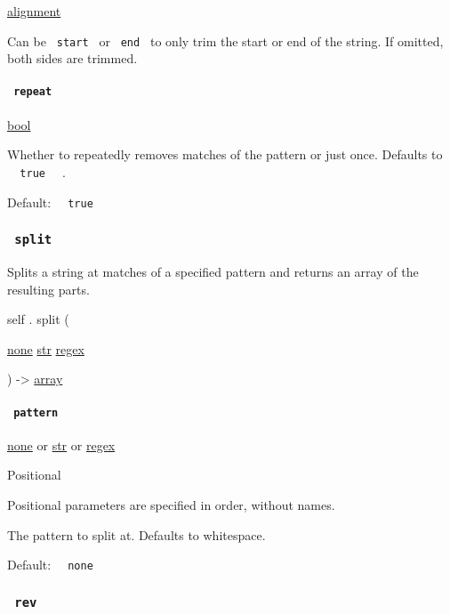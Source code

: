 \href{/docs/reference/layout/alignment/}{alignment}

Can be \texttt{\ start\ } or \texttt{\ end\ } to only trim the start or
end of the string. If omitted, both sides are trimmed.

\paragraph{\texorpdfstring{\texttt{\ repeat\ }}{ repeat }}\label{definitions-trim-repeat}

\href{/docs/reference/foundations/bool/}{bool}

Whether to repeatedly removes matches of the pattern or just once.
Defaults to \texttt{\ }{\texttt{\ true\ }}\texttt{\ } .

Default: \texttt{\ }{\texttt{\ true\ }}\texttt{\ }

\subsubsection{\texorpdfstring{\texttt{\ split\ }}{ split }}\label{definitions-split}

Splits a string at matches of a specified pattern and returns an array
of the resulting parts.

self { . } { split } (

{ \href{/docs/reference/foundations/none/}{none}
\href{/docs/reference/foundations/str/}{str}
\href{/docs/reference/foundations/regex/}{regex} }

) -\textgreater{} \href{/docs/reference/foundations/array/}{array}

\paragraph{\texorpdfstring{\texttt{\ pattern\ }}{ pattern }}\label{definitions-split-pattern}

\href{/docs/reference/foundations/none/}{none} {or}
\href{/docs/reference/foundations/str/}{str} {or}
\href{/docs/reference/foundations/regex/}{regex}

{{ Positional }}

\label{definitions-split-pattern-positional-tooltip}
Positional parameters are specified in order, without names.

The pattern to split at. Defaults to whitespace.

Default: \texttt{\ }{\texttt{\ none\ }}\texttt{\ }

\subsubsection{\texorpdfstring{\texttt{\ rev\ }}{ rev }}\label{definitions-rev}

